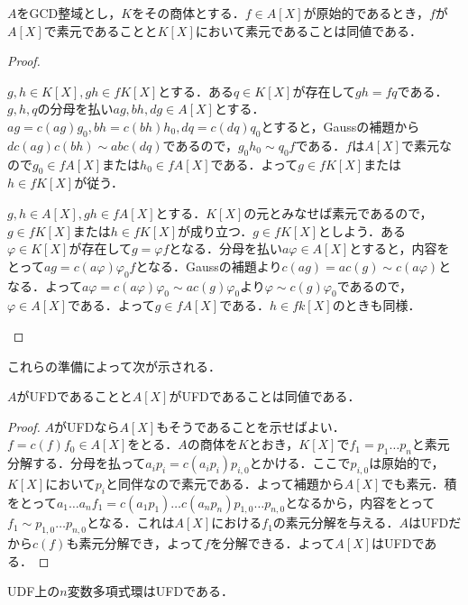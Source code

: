 \begin{lem}
	$A$をGCD整域とし，$K$をその商体とする．$f\in A[X]$が原始的であるとき，$f$が$A[X]$で素元であることと$K[X]$において素元であることは同値である．
\end{lem}
\begin{proof}
	\begin{eqv}
		\item $g,h\in K[X], gh\in fK[X]$とする．ある$q\in K[X]$が存在して$gh=fq$である．$g,h,q$の分母を払い$ag,bh,dg\in A[X]$とする．$ag=c(ag)g_0,bh=c(bh)h_0,dq=c(dq)q_0$とすると，Gaussの補題から$d c(ag)c(bh)\sim ab c(dq)$であるので，$g_0h_0\sim q_0f$である．$f$は$A[X]$で素元なので$g_0\in fA[X]$または$h_0\in fA[X]$である．よって$g\in fK[X]$または$h\in fK[X]$が従う．
		
		\item $g,h\in A[X], gh\in fA[X]$とする．$K[X]$の元とみなせば素元であるので，$g\in fK[X]$または$h\in fK[X]$が成り立つ．$g\in fK[X]$としよう．ある$\varphi\in K[X]$が存在して$g=\varphi f$となる．分母を払い$a\varphi\in A[X]$とすると，内容をとって$ag=c(a\varphi)\varphi_0f$となる．Gaussの補題より$c(ag)=ac(g)\sim c(a\varphi)$となる．よって$a\varphi=c(a\varphi)\varphi_0\sim ac(g)\varphi_0$より$\varphi\sim c(g)\varphi_0$であるので，$\varphi\in A[X]$である．よって$g\in fA[X]$である．$h\in fk[X]$のときも同様．
	\end{eqv}
\end{proof}

これらの準備によって次が示される．

\begin{thm}
	$A$がUFDであることと$A[X]$がUFDであることは同値である．
\end{thm}

\begin{proof}
	$A$がUFDなら$A[X]$もそうであることを示せばよい．$f=c(f)f_0\in A[X]$をとる．$A$の商体を$K$とおき，$K[X]$で$f_1=p_1\dots p_n$と素元分解する．分母を払って$a_ip_i=c(a_ip_i)p_{i,0}$とかける．ここで$p_{i,0}$は原始的で，$K[X]$において$p_i$と同伴なので素元である．よって補題から$A[X]$でも素元．積をとって$a_1\dots a_n f_1=c(a_1p_1)\dots c(a_np_n)p_{1,0}\dots p_{n,0}$となるから，内容をとって$f_1\sim p_{1,0}\dots p_{n,0}$となる．これは$A[X]$における$f_1$の素元分解を与える．$A$はUFDだから$c(f)$も素元分解でき，よって$f$を分解できる．よって$A[X]$はUFDである．
\end{proof}

\begin{cor}\label{cor:多変数もUFD}
	UDF上の$n$変数多項式環はUFDである．
\end{cor}

